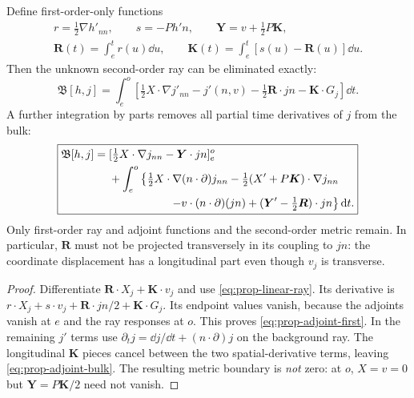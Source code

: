 \begin{proposition}\label{prop:propagation-adjoint}
Define first-order-only functions
\begin{gather*}
 r=\tfrac12\nabla h'_{nn},\qquad s=-Ph'n,\qquad \boldsymbol Y=v+\tfrac12P\boldsymbol K,\\
 \boldsymbol R(t)=\int_e^t r(u)\dd u,\qquad
 \boldsymbol K(t)=\int_e^t[s(u)-\boldsymbol R(u)]\dd u.
\end{gather*}
Then the unknown second-order ray can be eliminated exactly:
\begin{equation}\label{eq:prop-adjoint-first}
 \mathfrak B[h,j]=\int_e^o\left[
 \tfrac12X\cdot\nabla j'_{nn}-j'(n,v)
 -\tfrac12\boldsymbol R\cdot jn-\boldsymbol K\cdot G_j\right]\dd t.
\end{equation}
A further integration by parts removes all partial time derivatives of $j$ from the bulk:
\begin{equation}\label{eq:prop-adjoint-bulk}
\boxed{\begin{aligned}
 \mathfrak B[h,j]={}&
 [\tfrac12X\cdot\nabla j_{nn}-\boldsymbol Y\cdot jn]_e^o\\
 &+\int_e^o\left\{
 \tfrac12X\cdot\nabla(n\cdot\partial)j_{nn}
 -\tfrac12(X'+P\boldsymbol K)\cdot\nabla j_{nn}\right.\\
 &\hspace{19mm}\left.-v\cdot(n\cdot\partial)(jn)
 +(\boldsymbol Y'-\tfrac12\boldsymbol R)\cdot jn\right\}\dd t.
\end{aligned}}
\end{equation}
Only first-order ray and adjoint functions and the second-order metric remain. In particular,
$\boldsymbol R$ must not be projected transversely in its coupling to $jn$: the coordinate
displacement has a longitudinal part even though $v_j$ is transverse.
\end{proposition}
\begin{proof}
Differentiate $\boldsymbol R\cdot X_j+\boldsymbol K\cdot v_j$ and use
\eqref{eq:prop-linear-ray}. Its derivative is
$r\cdot X_j+s\cdot v_j+\boldsymbol R\cdot jn/2+\boldsymbol K\cdot G_j$.
Its endpoint values vanish, because the adjoints vanish at $e$ and the ray responses at $o$.
This proves \eqref{eq:prop-adjoint-first}. In the remaining $j'$ terms use
$\partial_tj=\dd j/\dd t+(n\cdot\partial)j$ on the background ray. The longitudinal
$\boldsymbol K$ pieces cancel between the two spatial-derivative terms, leaving
\eqref{eq:prop-adjoint-bulk}. The resulting metric boundary is \emph{not} zero:
at $o$, $X=v=0$ but $\boldsymbol Y=P\boldsymbol K/2$ need not vanish.
\end{proof}

